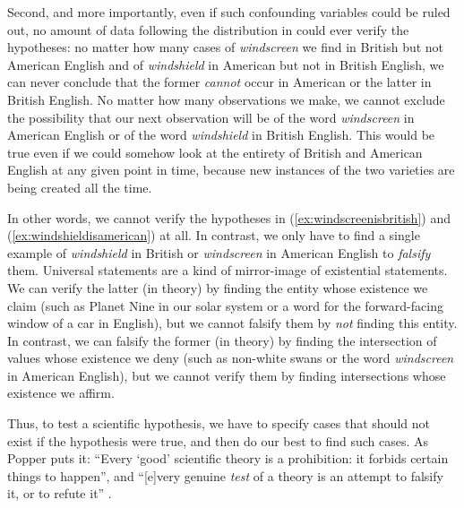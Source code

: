 Second, and more importantly, even if such confounding variables could be ruled out, no amount of data following the distribution  in  could ever verify the hypotheses:  no matter how many cases of \textit{windscreen} we find in British  but not American  English and of \textit{windshield} in American but not in British English, we can never conclude that the former \textit{cannot} occur in American or the latter in British English. No matter how many observations  we make, we cannot exclude the possibility that our next observation will be of the word \textit{windscreen} in American English or of the word \textit{windshield} in British  English. This would be true even if we could somehow look at the entirety of British and American  English at any given point in time, because new instances of the two varieties  are being created all the time.

In other words, we cannot verify the hypotheses  in (\ref{ex:windscreenisbritish}) and (\ref{ex:windshieldisamerican}) at all. In contrast, we only have to find a single example of \textit{windshield} in British  or \textit{windscreen} in American English to \textit{falsify}  them. Universal statements are a kind of mirror\hyp{}image of existential statements. We can verify the latter (in theory) by finding the entity whose existence we claim (such as Planet Nine in our solar system or a word for the forward\hyp{}facing window of a car in English), but we cannot falsify  them by \emph{not} finding this entity. In contrast, we can falsify the former (in theory) by finding the intersection of values whose existence we deny (such as non\hyp{}white swans or the word \textit{windscreen} in American  English), but we cannot verify them by finding intersections whose existence we affirm.

Thus, to test a scientific hypothesis,  we have to specify cases that should not exist if the hypothesis were true, and then do our best to find such cases. As Popper puts it: ``Every `good' scientific theory is a prohibition: it forbids certain things to happen'', and ``[e]very genuine \emph{test} of a theory is an attempt to falsify  it, or
to refute it'' \citep[36]{popper_conjectures_1963}.

